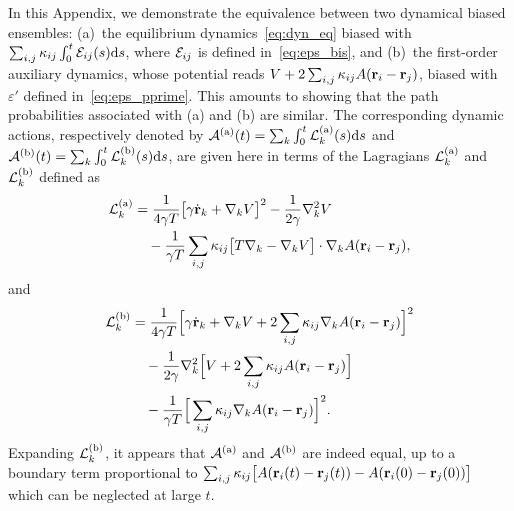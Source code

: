 \documentclass[pre, superscriptaddress, twocolumn,pre]{revtex4-1}
\begin{document}
In this Appendix, we demonstrate the equivalence between two dynamical biased ensembles: (a)~the equilibrium dynamics~\eqref{eq:dyn_eq} biased with $\sum_{i,j} \kappa_{ij}\int_0^t{\cal E}_{ij}(s){\rm d}s$, where ${\cal E}_{ij}$ is defined in~\eqref{eq:eps_bis}, and (b)~the first-order auxiliary dynamics, whose potential reads $V+2\sum_{i,j}\kappa_{ij}A({\bf r}_i-{\bf r}_j)$, biased with $\varepsilon'$ defined in~\eqref{eq:eps_pprime}. This amounts to showing that the path probabilities associated with (a) and (b) are similar. The corresponding dynamic actions, respectively denoted by ${\cal A}^{(\rm a)}(t)=\sum_k\int_0^t{\cal L}_k^{(\rm a)}(s){\rm d}s$ and ${\cal A}^{(\rm b)}(t)=\sum_k\int_0^t{\cal L}_k^{(\rm b)}(s){\rm d}s$, are given here in terms of the Lagragians ${\cal L}_k^{(\rm a)}$ and ${\cal L}_k^{(\rm b)}$ defined as
\begin{equation}
	\begin{aligned}
		{\cal L}_k^{(\rm a)} &= \frac{1}{4\gamma T} \big[\gamma\dot{\bf r}_k + \nabla_kV\big]^2 - \frac{1}{2\gamma} \nabla^2_kV
		\\
		&\quad - \frac{1}{\gamma T} \sum_{i,j}\kappa_{ij}\big[T \nabla_k - \nabla_k V\big] \cdot\nabla_k A({\bf r}_i-{\bf r}_j) ,
	\end{aligned}
\end{equation}
and
\begin{equation}
	\begin{aligned}
		{\cal L}_k^{(\rm b)}	&= \frac{1}{4\gamma T} \Big[\gamma\dot{\bf r}_k + \nabla_k V + 2\sum_{i,j}\kappa_{ij}\nabla_kA({\bf r}_i-{\bf r}_j)\Big]^2
		\\
		&\quad - \frac{1}{2\gamma} \nabla^2_k \Big[V + 2\sum_{i,j}\kappa_{ij} A({\bf r}_i-{\bf r}_j)\Big]
		\\
		&\quad - \frac{1}{\gamma T}\Big[\sum_{i,j}\kappa_{ij}\nabla_kA({\bf r}_i-{\bf r}_j)\Big]^2 .
	\end{aligned}
\end{equation}
Expanding ${\cal L}_k^{(\rm b)}$, it appears that ${\cal A}^{(\rm a)}$ and  ${\cal A}^{(\rm b)}$ are indeed equal, up to a boundary term proportional to $\sum_{i,j}\kappa_{ij}\big[A({\bf r}_i(t)-{\bf r}_j(t)) - A({\bf r}_i(0)-{\bf r}_j(0))\big]$ which can be neglected at large $t$.






\end{document}

